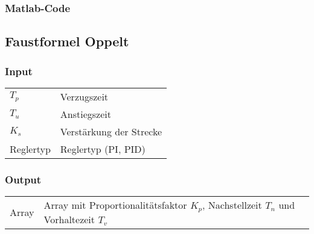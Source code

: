\subsubsection*{Matlab-Code}



\clearpage
\subsection{Faustformel Oppelt}
\label{app:algo:oppelt}

\subsubsection*{Input}

\begin{tabular}{p{40mm}l}
    $ T_p $        & Verzugszeit \\
    $ T_u $        & Anstiegszeit \\
    $ K_s $        & Verst\"arkung der Strecke \\
      Reglertyp    & Reglertyp (PI, PID)
\end{tabular}

\subsubsection*{Output}
\begin{tabular}{p{40mm}l}
    Array & \parbox[t][4em][s]{0.7\textwidth}{Array mit Proportionalit\"atsfaktor $ K_p $, Nachstellzeit $ T_n $ und Vorhaltezeit $ T_v $}
\end{tabular}

